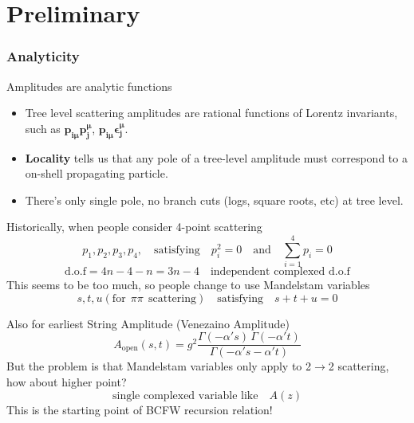 \documentclass{beamer}
\begin{document}
\section{Preliminary}
\begin{frame}
    \frametitle{Analyticity}
    Amplitudes are analytic functions
    \begin{itemize}
        \item Tree level scattering amplitudes are rational functions of Lorentz invariants, such as $\bm{p_{i\mu}p_j^\mu}$, $\bm{p_{i\mu}\epsilon_j^\mu}$.
        \item \textbf{Locality} tells us that any pole of a tree-level amplitude must correspond to a on-shell propagating particle. 
        \item There's only single pole, no branch cuts (logs, square roots, etc) at tree level.
\end{itemize}
Historically, when people consider 4-point scattering 
\begin{equation*}
    p_1,p_2,p_3,p_4, \quad \text{satisfying}\quad p_i^2=0 \quad\text{and}\quad \sum_{i=1}^{4}p_i=0
\end{equation*}
\begin{equation*}
    \text{d.o.f}=4n-4-n=3n-4\quad \text{independent complexed d.o.f}
\end{equation*}
This seems to be too much, so people change to use Mandelstam variables
\begin{equation*}
    s,t,u(\text{for}~~\pi\pi~~\text{scattering})\quad\text{satisfying}\quad s+t+u=0
\end{equation*}
\end{frame}

\begin{frame}
    Also for earliest String Amplitude (Venezaino Amplitude)
    \begin{equation*}
        A_{\text{open}}(s, t) = g^2 \frac{\Gamma(-\alpha' s)\, \Gamma(-\alpha' t)}{\Gamma(-\alpha' s - \alpha' t)}
    \end{equation*}
   But the problem is that Mandelstam variables only apply to 2$\rightarrow$2 scattering, how about higher point?
   \begin{equation*}
    \text{single complexed variable like}\quad A(z) 
   \end{equation*}
   This is the starting point of BCFW recursion relation!
\end{frame}
\end{document}
